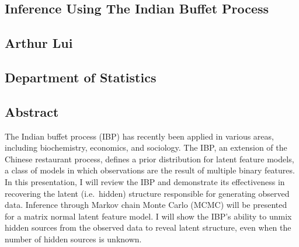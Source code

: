 \documentclass{article}
\def\wl{\par \vspace{\baselineskip}}
\begin{document}
\begin{center}
  \section*{Inference Using The Indian Buffet Process}
  \subsection*{Arthur Lui}
  \subsection*{Department of Statistics}
\end{center}
\wl

\subsection*{Abstract}


  The Indian buffet process (IBP) has recently been applied in various areas,
  including biochemistry, economics, and sociology. The IBP, an extension of the
  Chinese restaurant process, defines a prior distribution for latent feature
  models, a class of models in which observations are the result of multiple
  binary features. In this presentation, I will review the IBP and demonstrate
  its effectiveness in recovering the latent (i.e.\ hidden) structure
  responsible for generating observed data. Inference through Markov chain Monte
  Carlo (MCMC) will be presented for a matrix normal latent feature model. I
  will show the IBP's ability to unmix hidden sources from the observed data to
  reveal latent structure, even when the number of hidden sources is unknown.
\end{document}
